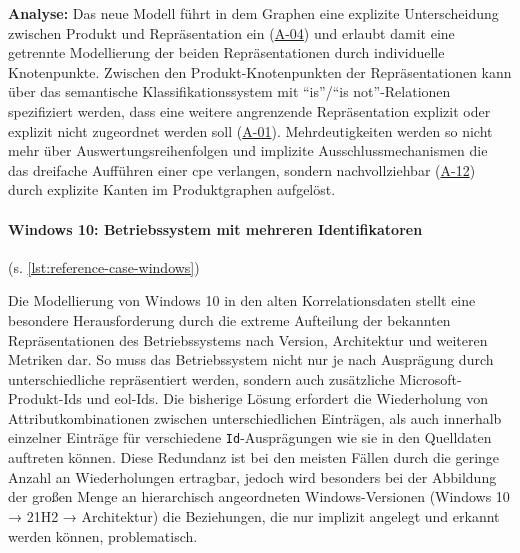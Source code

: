 \textbf{Analyse:}
Das neue Modell führt in dem Graphen eine explizite Unterscheidung zwischen Produkt und Repräsentation ein (\hyperref[subsec:req-product-concept]{A-04}) und erlaubt damit eine getrennte Modellierung der beiden Repräsentationen durch individuelle Knotenpunkte.
Zwischen den Produkt-Knotenpunkten der Repräsentationen kann über das semantische Klassifikationssystem mit \enquote{is}/\enquote{is not}-Relationen spezifiziert werden, dass eine weitere angrenzende Repräsentation explizit oder explizit nicht zugeordnet werden soll (\hyperref[subsec:req-format-product-graph]{A-01}).
Mehrdeutigkeiten werden so nicht mehr über Auswertungsreihenfolgen und implizite Ausschlussmechanismen die das dreifache Aufführen einer \acrshort{cpe} verlangen, sondern nachvollziehbar (\hyperref[subsec:req-reason-format]{A-12}) durch explizite Kanten im Produktgraphen aufgelöst.

\paragraph{Windows 10: Betriebssystem mit mehreren Identifikatoren}\label{par:reference-case-windows} (s. \autoref{lst:reference-case-windows})

Die Modellierung von Windows 10 in den alten Korrelationsdaten stellt eine besondere Herausforderung durch die extreme Aufteilung der bekannten Repräsentationen des Betriebssystems nach Version, Architektur und weiteren Metriken dar.
So muss das Betriebssystem nicht nur je nach Ausprägung durch unterschiedliche  repräsentiert werden, sondern auch zusätzliche Microsoft-Produkt-Ids und \acrshort{eol}-Ids.
Die bisherige Lösung erfordert die Wiederholung von Attributkombinationen zwischen unterschiedlichen Einträgen, als auch innerhalb einzelner Einträge für verschiedene \texttt{Id}-Ausprägungen wie sie in den Quelldaten auftreten können.
Diese Redundanz ist bei den meisten Fällen durch die geringe Anzahl an Wiederholungen ertragbar, jedoch wird besonders bei der Abbildung der großen Menge an hierarchisch angeordneten Windows-Versionen (Windows 10 → 21H2 → Architektur) die Beziehungen, die nur implizit angelegt und erkannt werden können, problematisch.

